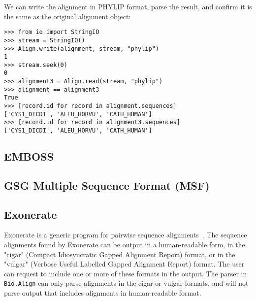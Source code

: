 We can write the alignment in PHYLIP format, parse the result, and confirm it is the same as the original alignment object:
\begin{verbatim}
>>> from io import StringIO
>>> stream = StringIO()
>>> Align.write(alignment, stream, "phylip")
1
>>> stream.seek(0)
0
>>> alignment3 = Align.read(stream, "phylip")
>>> alignment == alignment3
True
>>> [record.id for record in alignment.sequences]
['CYS1_DICDI', 'ALEU_HORVU', 'CATH_HUMAN']
>>> [record.id for record in alignment3.sequences]
['CYS1_DICDI', 'ALEU_HORVU', 'CATH_HUMAN']
\end{verbatim}

\subsection{EMBOSS}
\label{subsec:align_emboss}

\subsection{GSG Multiple Sequence Format (MSF)}
\label{subsec:align_msf}

\subsection{Exonerate}
\label{subsec:align_exonerate}

Exonerate is a generic program for pairwise sequence alignments~\cite{slater2005}. The sequence alignments found by Exonerate can be output in a human-readable form, in the "cigar" (Compact Idiosyncratic Gapped Alignment Report) format, or in the "vulgar" (Verbose Useful Labelled Gapped Alignment Report) format. The user can request to include one or more of these formats in the output. The parser in \verb|Bio.Align| can only parse alignments in the cigar or vulgar formats, and will not parse output that includes alignments in human-readable format.

